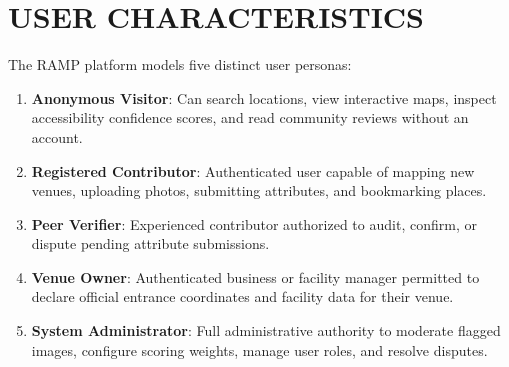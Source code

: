 \documentclass[12pt,a4paper]{report}
\begin{document}
\section{USER CHARACTERISTICS}
The RAMP platform models five distinct user personas:
\begin{enumerate}
    \item \textbf{Anonymous Visitor}: Can search locations, view interactive maps, inspect accessibility confidence scores, and read community reviews without an account.
    \item \textbf{Registered Contributor}: Authenticated user capable of mapping new venues, uploading photos, submitting attributes, and bookmarking places.
    \item \textbf{Peer Verifier}: Experienced contributor authorized to audit, confirm, or dispute pending attribute submissions.
    \item \textbf{Venue Owner}: Authenticated business or facility manager permitted to declare official entrance coordinates and facility data for their venue.
    \item \textbf{System Administrator}: Full administrative authority to moderate flagged images, configure scoring weights, manage user roles, and resolve disputes.
\end{enumerate}
\end{document}
